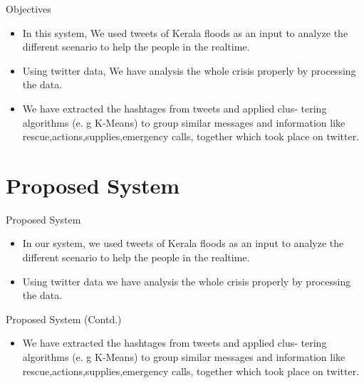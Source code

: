 \documentclass[10pt]{beamer}
\begin{document}
\begin{frame}[fragile]{Objectives}
\begin{itemize}
    \item In this system, We used tweets of Kerala floods as an
input to analyze the different scenario to help the people
in the realtime.
\item Using twitter data, We have
analysis the whole crisis properly by processing the data.
\item We
have extracted the hashtages from tweets and applied clus-
tering algorithms (e. g K-Means) to group similar messages
and information like rescue,actions,supplies,emergency calls,
together which took place on twitter.
\end{itemize}

  
\end{frame}

\section{Proposed System}
\begin{frame}[fragile]{Proposed System}

 \begin{itemize}
     \item In our system, we used tweets of Kerala floods as an
input to analyze the different scenario to help the people
in the realtime.
\item Using twitter data we have
analysis the whole crisis properly by processing the data.
 \end{itemize}
\end{frame}
\begin{frame}[fragile]{Proposed System (Contd.)}

 \begin{itemize}
     \item We
have extracted the hashtages from tweets and applied clus-
tering algorithms (e. g K-Means) to group similar messages
and information like rescue,actions,supplies,emergency calls,
together which took place on twitter.
 \end{itemize}
\end{frame}
\end{document}
